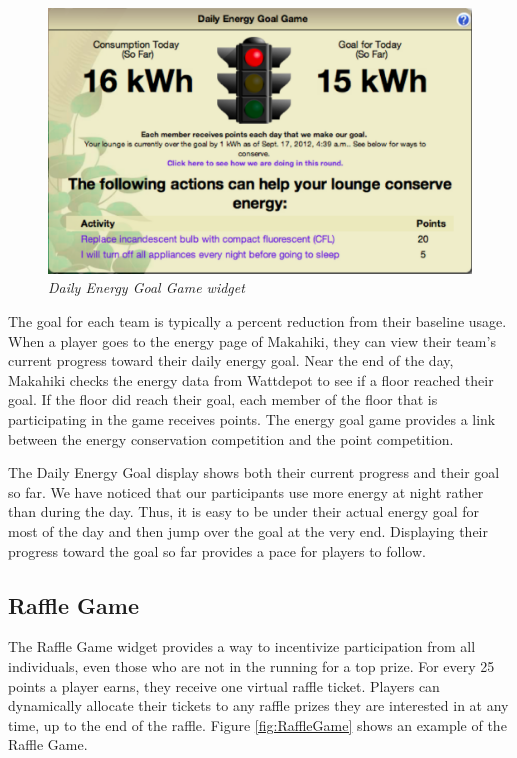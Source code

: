 \begin{figure}[th]
  \center
  \includegraphics[width=0.95\columnwidth]{daily-energy-goal-game.eps}
  \caption{\em Daily Energy Goal Game widget}
  \label{fig:DailyEnergyGoal}
\end{figure}

The goal for each team is typically a percent reduction from their baseline usage. When a player goes to the energy page of Makahiki, they can view their team's current progress toward their daily energy goal. Near the end of the day, Makahiki checks the energy data from Wattdepot to see if a floor reached their goal. If the floor did reach their goal, each member of the floor that is participating in the game receives points. The energy goal game provides a link between the energy conservation competition and the point competition.

The Daily Energy Goal display shows both their current progress and their goal so far. We have noticed that our participants use more energy at night rather than during the day. Thus, it is easy to be under their actual energy goal for most of the day and then jump over the goal at the very end. Displaying their progress toward the goal so far provides a pace for players to follow.

\subsection{Raffle Game}

The Raffle Game widget provides a way to incentivize participation from all individuals, even those who are not in the running for a top prize. For every 25 points a player earns, they receive one virtual raffle ticket. Players can dynamically allocate their tickets to any raffle prizes they are interested in at any time, up to the end of the raffle. Figure \ref{fig:RaffleGame} shows an example of the Raffle Game.


